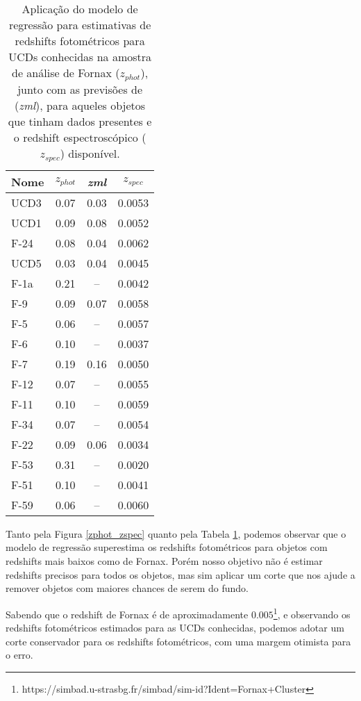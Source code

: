\begin{table}[!ht]
    \centering
    \caption{Aplicação do modelo de regressão para estimativas de redshifts fotométricos para UCDs conhecidas na amostra de análise de Fornax (\textit{$z_{phot}$}), junto com as previsões de \citep{erik_photoz_2024} (\textit{zml}), para aqueles objetos que tinham dados presentes e o redshift espectroscópico (\textit{$z_{spec}$}) disponível.}
    \begin{tabular}{lccc}
        \toprule
        Nome & \textit{$z_{phot}$} & \textit{zml} & \textit{$z_{spec}$}\\
        \midrule
        UCD3 & 0.07 & 0.03 & 0.0053\\
        UCD1 & 0.09 & 0.08 & 0.0052\\
        F-24 & 0.08 & 0.04 & 0.0062\\
        UCD5 & 0.03 & 0.04 & 0.0045\\
        F-1a & 0.21 & -- & 0.0042\\
        F-9 & 0.09 & 0.07 & 0.0058\\
        F-5 & 0.06 & -- & 0.0057\\
        F-6 & 0.10 & -- & 0.0037\\
        F-7 & 0.19 & 0.16 & 0.0050\\
        F-12 & 0.07 & -- & 0.0055\\
        F-11 & 0.10 & -- & 0.0059\\
        F-34 & 0.07 & -- & 0.0054\\ 
        F-22 & 0.09 & 0.06 & 0.0034\\
        F-53 & 0.31 & -- & 0.0020\\
        F-51 & 0.10 & -- & 0.0041\\
        F-59 & 0.06 & -- & 0.0060\\
        \midrule
    \end{tabular}
    \label{ucds_zphot}
\end{table}

Tanto pela Figura \ref{zphot_zspec} quanto pela Tabela \ref{ucds_zphot}, podemos observar que o modelo de regressão superestima os redshifts fotométricos para objetos com redshifts mais baixos como de Fornax. Porém nosso objetivo não é estimar redshifts precisos para todos os objetos, mas sim aplicar um corte que nos ajude a remover objetos com maiores chances de serem do fundo.

Sabendo que o redshift de Fornax é de aproximadamente $0.005$\footnote{https://simbad.u-strasbg.fr/simbad/sim-id?Ident=Fornax+Cluster}, e observando os redshifts fotométricos estimados para as UCDs conhecidas, podemos adotar um corte conservador para os redshifts fotométricos, com uma margem otimista para o erro.

